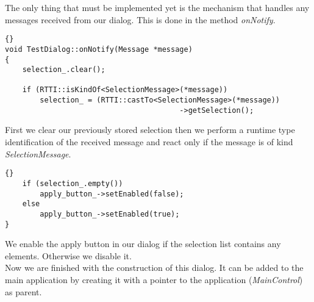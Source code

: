 The only thing that must be implemented yet is the mechanism that handles any
messages received from our dialog.
This is done in the method {\em onNotify}. 

\begin{lstlisting}{}
void TestDialog::onNotify(Message *message)
{
	selection_.clear();

	if (RTTI::isKindOf<SelectionMessage>(*message))
		selection_ = (RTTI::castTo<SelectionMessage>(*message))
										->getSelection();
\end{lstlisting}

First we clear our previously stored selection then we perform a runtime type identification
of the received message and react only if the message is of kind {\em SelectionMessage}.
	
\begin{lstlisting}{}
	if (selection_.empty())
		apply_button_->setEnabled(false);
	else
		apply_button_->setEnabled(true);
}
\end{lstlisting}

We enable the apply button in our dialog if the selection list contains any elements.
Otherwise we disable it.\\

Now we are finished with the construction of this dialog. It can be added to the main application
by creating it with a pointer to the application ({\em MainControl}) as
parent.

